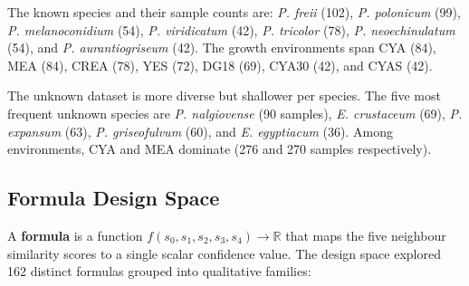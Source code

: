 \documentclass[11pt,a4paper]{article}
\begin{document}
\noindent The known species and their sample counts are: \textit{P. freii} (102), \textit{P. polonicum} (99), \textit{P. melanoconidium} (54), \textit{P. viridicatum} (42), \textit{P. tricolor} (78), \textit{P. neoechinulatum} (54), and \textit{P. aurantiogriseum} (42). The growth environments span CYA (84), MEA (84), CREA (78), YES (72), DG18 (69), CYA30 (42), and CYAS (42).

The unknown dataset is more diverse but shallower per species. The five most frequent unknown species are \textit{P. nalgiovense} (90 samples), \textit{E. crustaceum} (69), \textit{P. expansum} (63), \textit{P. griseofulvum} (60), and \textit{E. egyptiacum} (36). Among environments, CYA and MEA dominate (276 and 270 samples respectively).

\subsection{Formula Design Space}

A \textbf{formula} is a function $f(s_0, s_1, s_2, s_3, s_4) \rightarrow \mathbb{R}$ that maps the five neighbour similarity scores to a single scalar confidence value. The design space explored 162 distinct formulas grouped into qualitative families:
\end{document}
